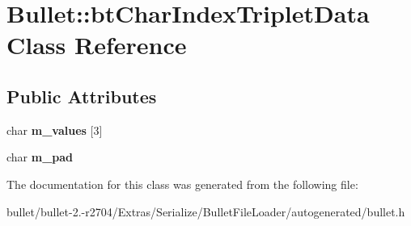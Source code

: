 \hypertarget{class_bullet_1_1bt_char_index_triplet_data}{\section{Bullet\+:\+:bt\+Char\+Index\+Triplet\+Data Class Reference}
\label{class_bullet_1_1bt_char_index_triplet_data}
}
\subsection*{Public Attributes}
\begin{DoxyCompactItemize}
\item 
\hypertarget{class_bullet_1_1bt_char_index_triplet_data_acba74b3c9accc9bbe0e9350debfb75bf}{char {\bfseries m\+\_\+values} \mbox{[}3\mbox{]}}\label{class_bullet_1_1bt_char_index_triplet_data_acba74b3c9accc9bbe0e9350debfb75bf}

\item 
\hypertarget{class_bullet_1_1bt_char_index_triplet_data_a371ccb1f2667d5f696e1d8072aa205b4}{char {\bfseries m\+\_\+pad}}\label{class_bullet_1_1bt_char_index_triplet_data_a371ccb1f2667d5f696e1d8072aa205b4}

\end{DoxyCompactItemize}


The documentation for this class was generated from the following file\+:\begin{DoxyCompactItemize}
\item 
bullet/bullet-\/2.-\/r2704/\+Extras/\+Serialize/\+Bullet\+File\+Loader/autogenerated/bullet.\+h\end{DoxyCompactItemize}
